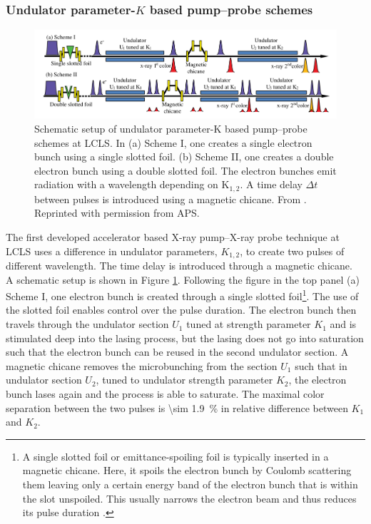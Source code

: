 \subsubsection{Undulator parameter-$K$ based pump--probe schemes}\label{sec:k-based-pump--probe}
%
\begin{figure}
	\centering
		\includegraphics[width=1.00\textwidth]{images/Albertos-pump-probe-scheme.png}
	\caption[Schematic setup of an undulator based pump--probe scheme.]{Schematic setup of undulator parameter-K based pump--probe schemes at LCLS. In (a) Scheme I, one creates a single electron bunch using a single slotted foil. (b) Scheme II, one creates a double electron bunch using a double slotted foil. The electron bunches emit radiation with a wavelength depending on K$_{1,2}$. A time delay $\Delta t$ between pulses is introduced using a magnetic chicane. From \citep{Lutman-2013-PRL}. Reprinted with permission from APS.}
	\label{fig:Albertos-pump-probe-scheme}
\end{figure}
%
The first developed accelerator based X-ray pump--X-ray probe technique at LCLS \citep{Lutman-2013-PRL} uses a difference in undulator parameters, $K_{1,2}$, to create two pulses of different wavelength. The time delay is introduced through a magnetic chicane.\\[1\baselineskip]
%
A schematic setup is shown in Figure \ref{fig:Albertos-pump-probe-scheme}.
Following the figure in the top panel (a) Scheme I, one electron bunch is created through a single slotted foil\footnote{A single slotted foil or emittance-spoiling foil is typically inserted in a magnetic chicane. Here, it spoils the electron bunch by Coulomb scattering them leaving only a certain energy band of the electron bunch that is within the slot unspoiled. This usually narrows the electron beam and thus reduces its pulse duration \citep{Emma-2004-PRL}.}. The use of the slotted foil enables control over the pulse duration. The electron bunch then travels through the undulator section $U_{1}$ tuned at strength parameter $K_{1}$ and is stimulated deep into the lasing process, but the lasing does not go into saturation such that the electron bunch can be reused in the second undulator section. A magnetic chicane removes the microbunching from the section $U_{1}$ such that in undulator section $U_{2}$, tuned to undulator strength parameter $K_{2}$, the electron bunch lases again and the process is able to saturate. The maximal color separation between the two pulses is \SI{\sim 1.9}{\percent} in relative difference between $K_{1}$ and $K_{2}$.\\[1\baselineskip]
